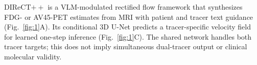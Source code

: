 DIReCT$++$ is a VLM-modulated rectified flow framework that synthesizes FDG- or AV45-PET estimates from MRI with patient and tracer text guidance (Fig.~\ref{fig:1}A). Its conditional 3D U-Net predicts a tracer-specific velocity field for learned one-step inference (Fig.~\ref{fig:1}C). The shared network handles both tracer targets; this does not imply simultaneous dual-tracer output or clinical molecular validity.
